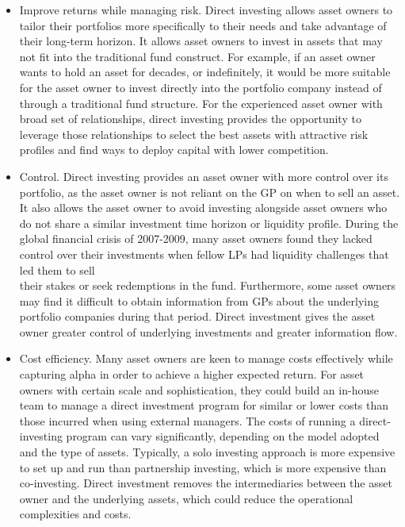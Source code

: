 \documentclass[11pt]{article}
\begin{document}
\begin{itemize}
  \item Improve returns while managing risk. Direct investing allows asset owners to tailor their portfolios more specifically to their needs and take advantage of their long-term horizon. It allows asset owners to invest in assets that may not fit into the traditional fund construct. For example, if an asset owner wants to hold an asset for decades, or indefinitely, it would be more suitable for the asset owner to invest directly into the portfolio company instead of through a traditional fund structure. For the experienced asset owner with broad set of relationships, direct investing provides the opportunity to leverage those relationships to select the best assets with attractive risk profiles and find ways to deploy capital with lower competition.
  \item Control. Direct investing provides an asset owner with more control over its portfolio, as the asset owner is not reliant on the GP on when to sell an asset. It also allows the asset owner to avoid investing alongside asset owners who do not share a similar investment time horizon or liquidity profile. During the global financial crisis of 2007-2009, many asset owners found they lacked control over their investments when fellow LPs had liquidity challenges that led them to sell\\
their stakes or seek redemptions in the fund. Furthermore, some asset owners may find it difficult to obtain information from GPs about the underlying portfolio companies during that period. Direct investment gives the asset owner greater control of underlying investments and greater information flow.
  \item Cost efficiency. Many asset owners are keen to manage costs effectively while capturing alpha in order to achieve a higher expected return. For asset owners with certain scale and sophistication, they could build an in-house team to manage a direct investment program for similar or lower costs than those incurred when using external managers. The costs of running a direct-investing program can vary significantly, depending on the model adopted and the type of assets. Typically, a solo investing approach is more expensive to set up and run than partnership investing, which is more expensive than co-investing. Direct investment removes the intermediaries between the asset owner and the underlying assets, which could reduce the operational complexities and costs.
\end{itemize}
\end{document}
